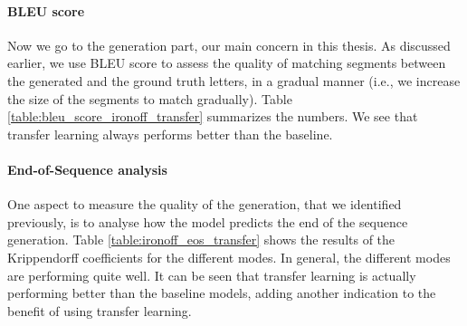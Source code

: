 
    \paragraph{BLEU score}
      Now we go to the generation part, our main concern in this thesis. As discussed earlier, we use BLEU score to assess the quality of matching segments between the generated and the ground truth letters, in a gradual manner (i.e., we increase the size of the segments to match gradually). Table \ref{table:bleu_score_ironoff_transfer} summarizes the numbers. We see that transfer learning always performs better than the baseline.
    \paragraph{End-of-Sequence analysis}
    One aspect to measure the quality of the generation, that we identified previously, is to analyse how the model predicts the end of the sequence generation. Table \ref{table:ironoff_eos_transfer} shows the results of the Krippendorff coefficients for the different modes. In general, the different modes are performing quite well. It can be seen that transfer learning is actually performing better than the baseline models, adding another indication to the benefit of using transfer learning.

